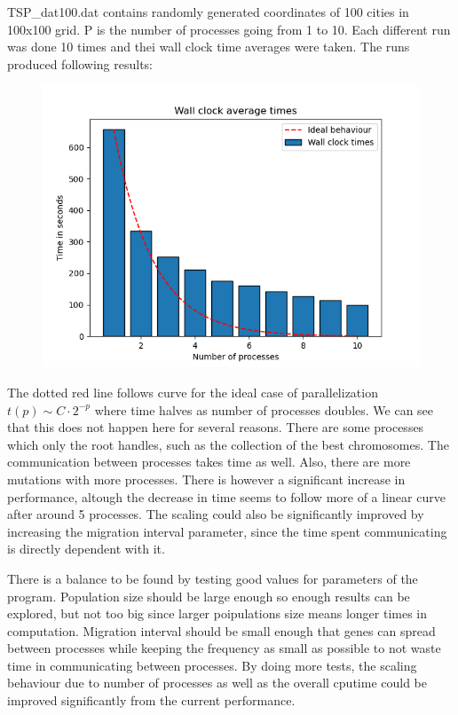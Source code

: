 \documentclass[12pt]{article}
\begin{document}
TSP\_dat100.dat contains randomly generated coordinates of 100 cities in 100x100 grid. P is the
number of processes going from 1 to 10. Each different run was done 10 times and thei wall clock
time averages were taken. The runs produced following results:
\begin{figure}[h]
  \includegraphics[scale=0.8]{walltimes.png}
\end{figure}


The dotted red line follows curve for the ideal case of parallelization \\$t(p)\sim C\cdot 2^{-p}$
where time halves as number of processes doubles. We can see that this does not happen here for
several reasons. There are some processes which only the root handles, such as the collection of
the best chromosomes. The communication between processes takes time as well. Also, there are more
mutations with more processes. There is however a significant increase in performance, altough the
decrease in time seems to follow more of a linear curve after around 5 processes. The scaling could
also be significantly improved by increasing the migration interval parameter, since the time spent
communicating is directly dependent with it.

There is a balance to be found by testing good values for parameters of the program. Population
size should be large enough so enough results can be explored, but not too big since larger
poipulations size means longer times in computation. Migration interval should be small enough that
genes can spread between processes while keeping the frequency as small as possible to not waste
time in communicating between processes. By doing more tests, the scaling behaviour due to number
of processes as well as the overall cputime could be improved significantly from the current
performance.
\end{document}

